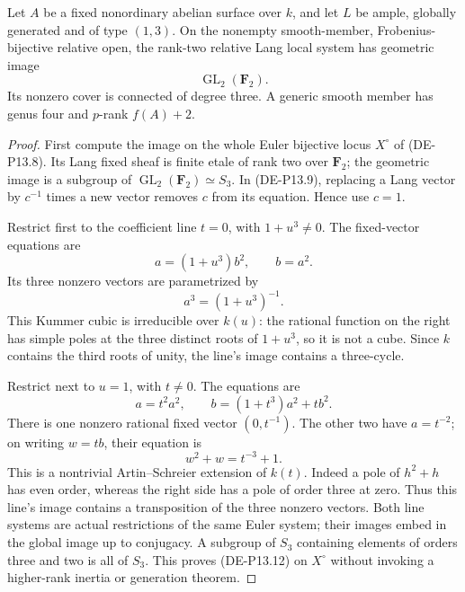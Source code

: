 \begin{theorem}
\label{thm:DE-primitive-one-three-full-image}
Let \(A\) be a fixed nonordinary abelian surface over \(k\), and
let \(L\) be ample, globally generated and of type \((1,3)\).
On the nonempty smooth-member, Frobenius-bijective relative open,
the rank-two relative Lang local system has geometric image
\[
                       \operatorname{GL}_2(\mathbf F_2).
                                                               \tag{DE-P13.12}
\]
Its nonzero cover is connected of degree three. A generic smooth
member has genus four and \(p\)-rank \(f(A)+2\).
\end{theorem}
\begin{proof}
First compute the image on the whole Euler bijective locus
\(X^\circ\) of (DE-P13.8). Its Lang fixed sheaf is finite etale
of rank two over \(\mathbf F_2\); the geometric image is a
subgroup of \(\operatorname{GL}_2(\mathbf F_2)\simeq S_3\).
In (DE-P13.9), replacing a Lang vector by \(c^{-1}\) times a
new vector removes \(c\) from its equation. Hence use \(c=1\).

Restrict first to the coefficient line \(t=0\), with
\(1+u^3\ne0\). The fixed-vector equations are
\[
                  a=(1+u^3)b^2,\qquad b=a^2.
\]
Its three nonzero vectors are parametrized by
\[
                         a^3=(1+u^3)^{-1}.           \tag{DE-P13.13}
\]
This Kummer cubic is irreducible over \(k(u)\): the rational
function on the right has simple poles at the three distinct
roots of \(1+u^3\), so it is not a cube. Since \(k\) contains
the third roots of unity, the line's image contains a three-cycle.

Restrict next to \(u=1\), with \(t\ne0\). The equations are
\[
             a=t^2a^2,\qquad b=(1+t^3)a^2+t b^2.
\]
There is one nonzero rational fixed vector \((0,t^{-1})\).
The other two have \(a=t^{-2}\); on writing \(w=tb\), their
equation is
\[
                          w^2+w=t^{-3}+1.            \tag{DE-P13.14}
\]
This is a nontrivial Artin--Schreier extension of \(k(t)\).
Indeed a pole of \(h^2+h\) has even order, whereas the right
side has a pole of order three at zero. Thus this line's image
contains a transposition of the three nonzero vectors. Both
line systems are actual restrictions of the same Euler system;
their images embed in the global image up to conjugacy.
A subgroup of \(S_3\) containing elements of orders three and
two is all of \(S_3\). This proves (DE-P13.12) on \(X^\circ\)
without invoking a higher-rank inertia or generation theorem.


\end{proof}
